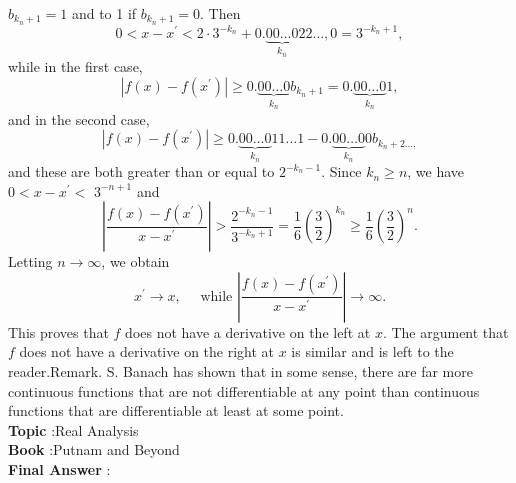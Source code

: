 \documentclass[10pt]{article}
\begin{document}
$b_{k_{n}+1}=1$ and to 1 if $b_{k_{n}+1}=0$. Then$$ 0<x-x^{\prime}<2 \cdot 3^{-k_{n}}+0 . \underbrace{00 \ldots 0}_{k_{n}} 22 \ldots, 0=3^{-k_{n}+1}, $$while in the first case,$$ \left|f(x)-f\left(x^{\prime}\right)\right| \geq 0 . \underbrace{00 \ldots 0}_{k_{n}} b_{k_{n}+1}=0 . \underbrace{00 \ldots 0}_{k_{n}} 1, $$and in the second case,$$ \left|f(x)-f\left(x^{\prime}\right)\right| \geq 0 . \underbrace{00 \ldots 0}_{k_{n}} 11 \ldots 1-0 . \underbrace{00 \ldots 0}_{k_{n}} 0 b_{k_{n}+2 \ldots,} $$and these are both greater than or equal to $2^{-k_{n}-1}$. Since $k_{n} \geq n$, we have $0<x-x^{\prime}<$ $3^{-n+1}$ and$$ \left|\frac{f(x)-f\left(x^{\prime}\right)}{x-x^{\prime}}\right|>\frac{2^{-k_{n}-1}}{3^{-k_{n}+1}}=\frac{1}{6}\left(\frac{3}{2}\right)^{k_{n}} \geq \frac{1}{6}\left(\frac{3}{2}\right)^{n} . $$Letting $n \rightarrow \infty$, we obtain$$ x^{\prime} \rightarrow x, \quad \text { while }\left|\frac{f(x)-f\left(x^{\prime}\right)}{x-x^{\prime}}\right| \rightarrow \infty . $$This proves that $f$ does not have a derivative on the left at $x$. The argument that $f$ does not have a derivative on the right at $x$ is similar and is left to the reader.Remark. S. Banach has shown that in some sense, there are far more continuous functions that are not differentiable at any point than continuous functions that are differentiable at least at some point.\\
\textbf{Topic} :Real Analysis\\
\textbf{Book} :Putnam and Beyond\\
\textbf{Final Answer} :\\
\end{document}
